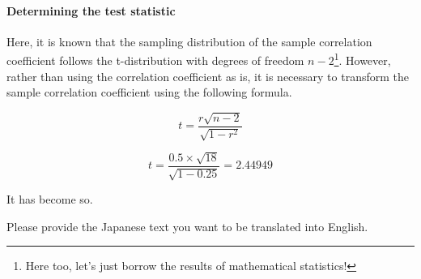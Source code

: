 \documentclass{ltjsbook}
\begin{document}
\paragraph{Determining the test statistic}

Here, it is known that the sampling distribution of the sample correlation coefficient follows the t-distribution with degrees of freedom $n-2$\footnote{Here too, let's just borrow the results of mathematical statistics!}. However, rather than using the correlation coefficient as is, it is necessary to transform the sample correlation coefficient using the following formula.

\[ t = \frac{r\sqrt{n-2}}{\sqrt{1-r^2}} \]




\[ t = \frac{0.5 \times \sqrt{18}}{\sqrt{1-0.25}} = 2.44949 \]

It has become so.

Please provide the Japanese text you want to be translated into English.
\end{document}
